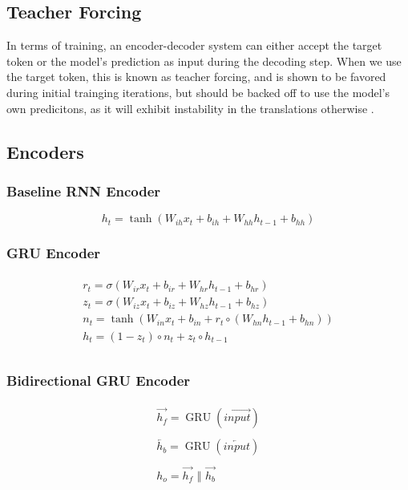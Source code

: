 \documentclass[twoside,twocolumn]{article}
\begin{document}
\subsection{Teacher Forcing}
In terms of training, an encoder-decoder system can either accept the target
token or the model's prediction as input during the decoding step. When we use
the target token, this is known as teacher forcing, and is shown to be favored
during initial trainging iterations, but should be backed off to use the
model's own predicitons, as it will exhibit instability in the translations
otherwise \cite{lamb2016professor}.

\subsection{Encoders}
\subsubsection{Baseline RNN Encoder}
\begin{equation}
  \label{eq:rnn}
  h_t = \tanh(W_{ih} x_t + b_{ih}  +  W_{hh} h_{t-1} + b_{hh})
\end{equation}

\subsubsection{GRU Encoder}
\begin{equation}
  \begin{split}\begin{array}{ll}
    r_t = \sigma(W_{ir} x_t + b_{ir} + W_{hr} h_{t-1} + b_{hr}) \\
    z_t = \sigma(W_{iz} x_t + b_{iz} + W_{hz} h_{t-1} + b_{hz}) \\
    n_t = \tanh(W_{in} x_t + b_{in} + r_t \circ (W_{hn} h_{t-1}+ b_{hn})) \\
    h_t = (1 - z_t) \circ n_t + z_t \circ h_{t-1} \\
  \end{array}\end{split}
\end{equation}
\subsubsection{Bidirectional GRU Encoder}
\begin{equation}
  \label{eq:bidirectional}
  \begin{split}
    \begin{array}{ll}
      \overrightarrow{h_f} = \operatorname{GRU}(\overrightarrow{input})\\
      \\
      \overleftarrow{h_b} = \operatorname{GRU}(\overleftarrow{input})\\
      \\
      h_o = \overrightarrow{h_f} \,\,\Vert \,\, \overrightarrow{h_b}\\
      \\
    \end{array}
  \end{split}
\end{equation}
\end{document}
